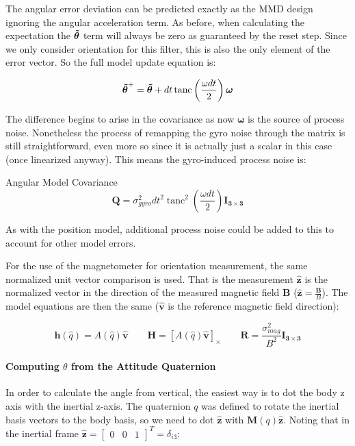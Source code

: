 \documentclass{article}
\DeclareMathOperator{\tanc}{tanc}
\renewcommand{\vec}{\boldsymbol} %
\newcommand{\mat}{\vec}
\newcommand{\uvec}[1]{\vec{\hat{#1}}}
\newcommand{\bmat}[1]{\begin{bmatrix} #1 \end{bmatrix}}
\begin{document}
	The angular error deviation can be predicted exactly as the MMD design ignoring the angular acceleration term.  As before, when calculating the expectation the $\aerr$ term will always be zero as guaranteed by the reset step.  Since we only consider orientation for this filter, this is also the only element of the error vector.  So the full model update equation is:
	
	\begin{equation}
		\aerr^+ = \aerr + dt\tanc\left(\frac{\omega dt}{2}\right)\vec{\omega}
	\end{equation}
	
	The difference begins to arise in the covariance as now $\vec{\omega}$ is the source of process noise.  Nonetheless the process of remapping the gyro noise through the matrix is still straightforward, even more so since it is actually just a scalar in this case (once linearized anyway).  This means the gyro-induced process noise is:
	
	Angular Model Covariance
	\begin{equation}
		\mat{Q} = \sigma_{gyro}^2 dt^2\tanc^2\left(\frac{\omega dt}{2}\right) \mat{I_{3\times3}}
	\end{equation}
	
	As with the position model, additional process noise could be added to this to account for other model errors.
	
	For the use of the magnetometer for orientation measurement, the same normalized unit vector comparison is used.  That is the measurement $\uvec{z}$ is the normalized vector in the direction of the measured magnetic field $\vec{B}$ ($\uvec{z} = \frac{\vec{B}}{B}$).  The model equations are then the same ($\uvec{v}$ is the reference magnetic field direction):
	
	\begin{equation}
		\vec{h}(\hat{q}) = A(\hat{q})\uvec{v}\qquad\mat{H} = [A(\hat{q})\uvec{v}]_\times\qquad
		\mat{R} = \frac{\sigma_{mag}^2}{B^2}\mat{I_{3\times 3}}
	\end{equation}
	
	\paragraph{Computing $\theta$ from the Attitude Quaternion}
	
	In order to calculate the angle from vertical, the easiest way is to dot the body z axis with the inertial z-axis.  The quaternion $q$ was defined to rotate the inertial basis vectors to the body basis, so we need to dot $\uvec{z}$ with $\mat{M}(q)\uvec{z}$.  Noting that in the inertial frame $\uvec{z} = \bmat{0&0&1}^T = \delta_{i3}$:
	
\end{document}
